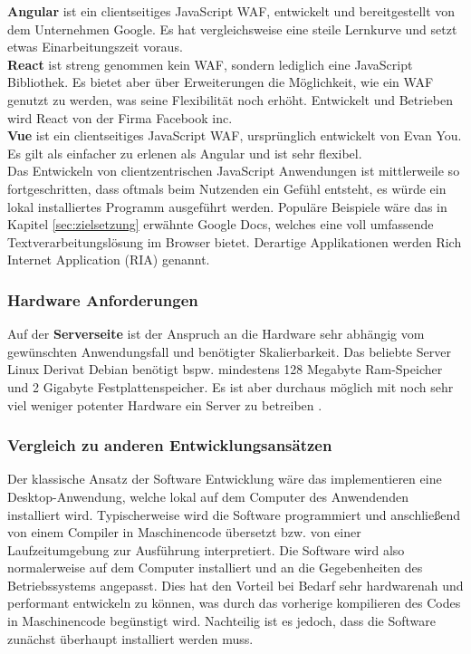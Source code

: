  \textbf{Angular} ist ein clientseitiges JavaScript WAF, entwickelt und bereitgestellt von dem Unternehmen Google. Es hat vergleichsweise eine steile Lernkurve und setzt etwas Einarbeitungszeit voraus. \\ 
 \textbf{React} ist streng genommen kein WAF, sondern lediglich eine JavaScript Bibliothek. Es bietet aber über Erweiterungen die Möglichkeit, wie ein WAF genutzt zu werden, was seine Flexibilität noch erhöht. Entwickelt und Betrieben wird React von der Firma Facebook inc. \\
 \textbf{Vue} ist ein clientseitiges JavaScript WAF, ursprünglich entwickelt von Evan You. Es gilt als einfacher zu erlenen als Angular und ist sehr flexibel. \\
 
 
 Das Entwickeln von clientzentrischen JavaScript Anwendungen ist mittlerweile so fortgeschritten, dass oftmals beim Nutzenden ein Gefühl entsteht, es würde ein lokal installiertes Programm ausgeführt werden. Populäre Beispiele wäre das in Kapitel \ref{sec:zielsetzung} erwähnte Google Docs, welches eine voll umfassende Textverarbeitungslösung im Browser bietet. Derartige Applikationen werden Rich Internet Application (RIA) genannt.
 

\subsubsection{Hardware Anforderungen}\label{sec:hardware}
Auf der \textbf{Serverseite} ist der Anspruch an die Hardware sehr abhängig vom gewünschten Anwendungsfall und benötigter Skalierbarkeit. Das beliebte Server Linux Derivat Debian benötigt bspw. mindestens 128 Megabyte Ram-Speicher und 2 Gigabyte Festplattenspeicher. Es ist aber durchaus möglich mit noch sehr viel weniger potenter Hardware ein Server zu betreiben \cite{dpakt2019:online}. 
\subsubsection{Vergleich zu anderen Entwicklungsansätzen}\label{sec:vorundnachteileweb}
Der klassische Ansatz der Software Entwicklung wäre das implementieren eine Desktop-Anwendung, welche lokal
auf dem Computer des Anwendenden installiert wird. Typischerweise wird die Software programmiert und anschließend von einem Compiler in Maschinencode übersetzt bzw. von einer Laufzeitumgebung zur Ausführung interpretiert. Die Software wird also normalerweise auf dem Computer installiert und an die Gegebenheiten des Betriebssystems angepasst. Dies hat den Vorteil bei Bedarf sehr hardwarenah und performant entwickeln zu können, was durch das vorherige kompilieren des Codes in Maschinencode begünstigt wird. Nachteilig ist es jedoch, dass die Software zunächst überhaupt installiert werden muss. 

